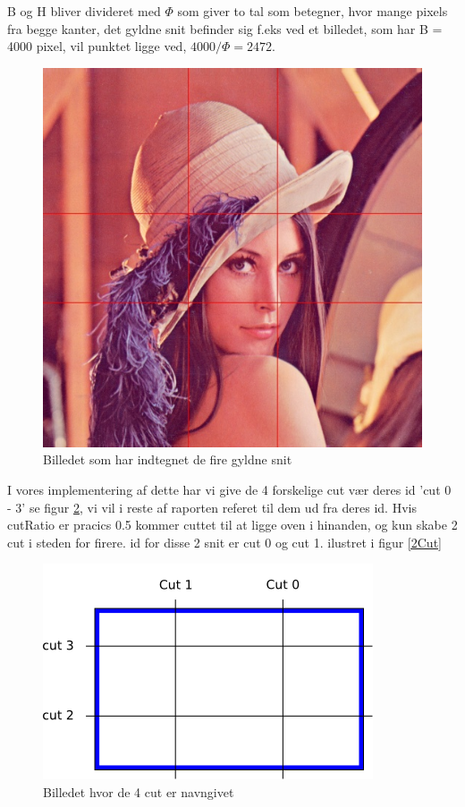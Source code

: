 B og H bliver divideret med $\varPhi$ som giver to tal som betegner, hvor
mange pixels fra begge kanter, det gyldne snit befinder sig f.eks ved et
billedet, som har B = 4000 pixel, vil punktet ligge ved, $4000/\varPhi = 2472$.
\begin{figure}[h]
	\begin{center}
		\includegraphics[scale=0.42,angle=0]{afsnit/vores_implementation/billeder/naiv_algoritme/Lenagolden}
	\end{center}
	\caption[]{Billedet som har indtegnet de fire gyldne snit}
	\label{lenasnit2}
\end{figure}

I vores implementering af dette har vi give de 4 forskelige cut vær
deres id 'cut 0 - 3' se figur \ref{cut}, vi vil i reste af raporten
referet til dem ud fra deres id. Hvis cutRatio er pracics 0.5 kommer cuttet til at ligge oven i hinanden,
og kun skabe 2 cut i steden for firere. id for disse 2 snit er cut 0 og
cut 1. ilustret i figur \ref{2Cut}

\begin{figure}[h]
	\begin{center}
		\includegraphics[scale=0.42,angle=0]{afsnit/vores_implementation/billeder/naiv_algoritme/Cut}
	\end{center}
	\caption[]{Billedet hvor de 4 cut er navngivet}
	\label{cut}
\end{figure}



